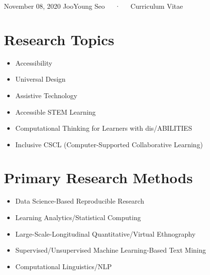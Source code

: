 \documentclass[11pt, a4paper]{awesome-cv}
\providecommand{\tightlist}{%
	\setlength{\itemsep}{0pt}\setlength{\parskip}{0pt}}
\begin{document}
\makecvheader

\makecvfooter
  {November 08, 2020}
    {JooYoung Seo~~~·~~~Curriculum Vitae}
  {\thepage}





\hypertarget{research-topics}{%
\section{Research Topics}\label{research-topics}}

\begin{itemize}
\tightlist
\item
  Accessibility
\item
  Universal Design
\item
  Assistive Technology
\item
  Accessible STEM Learning
\item
  Computational Thinking for Learners with dis/ABILITIES
\item
  Inclusive CSCL (Computer-Supported Collaborative Learning)
\end{itemize}

\hypertarget{primary-research-methods}{%
\section{Primary Research Methods}\label{primary-research-methods}}

\begin{itemize}
\tightlist
\item
  Data Science-Based Reproducible Research
\item
  Learning Analytics/Statistical Computing
\item
  Large-Scale-Longitudinal Quantitative/Virtual Ethnography
\item
  Supervised/Unsupervised Machine Learning-Based Text Mining
\item
  Computational Linguistics/NLP
\end{itemize}
\end{document}
